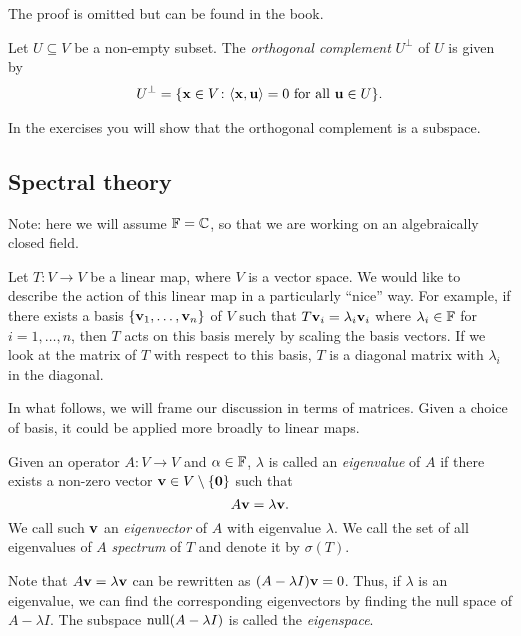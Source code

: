 \documentclass{article}
\begin{document}
The proof is omitted but can be found in the book.

\begin{definition}
Let $U\subseteq V$ be a non-empty subset. The \emph{orthogonal complement} $U^\perp$ of $U$ is given by
\begin{align*}
    U^\perp = \{ {\mathbf{x}} \in V \colon \langle {\mathbf{x}},{\mathbf{u}} \rangle = 0 \text{ for all } {\mathbf{u}} \in U\}.
\end{align*}
\end{definition}

In the exercises you will show that the orthogonal complement is a subspace. 


\subsection{Spectral theory}

Note: here we will assume ${\mathbb{F}} = {\mathbb{C}}$, so that we are working on an algebraically closed field.


Let $T \colon V \to V$ be a linear map, where $V$ is a vector space.  We would like to describe the action of this linear map in a particularly ``nice'' way. For example, if there exists a basis $\{{\mathbf{v}}_1, \ldots, {\mathbf{v}}_n\}$ of $V$ such that $T{\mathbf{v}}_i = \lambda_i {\mathbf{v}}_i$ where $\lambda_i \in {\mathbb{F}}$ for $i = 1, \ldots, n$, then $T$ acts on this basis merely by scaling the basis vectors. If we look at the matrix of $T$ with respect to this basis, $T$ is a diagonal matrix with $\lambda_i$ in the diagonal. 

In what follows, we will frame our discussion in terms of matrices. Given a choice of basis, it could be applied more broadly to linear maps.

\begin{definition}
Given an operator $A \colon V \to V$ and $\alpha \in {\mathbb{F}}$, $\lambda$ is called an \emph{eigenvalue} of $A$ if there exists a non-zero vector ${\mathbf{v}} \in V\setminus\{{\mathbf{0}}\}$ such that 
$$A {\mathbf{v}} = \lambda {\mathbf{v}}.$$
We call such ${\mathbf{v}}$ an \emph{eigenvector} of $A$ with eigenvalue $\lambda$. We call the set of all eigenvalues of $A$ \emph{spectrum} of $T$ and denote it by $\sigma(T)$.
\end{definition}

Note that $A {\mathbf{v}} = \lambda {\mathbf{v}}$ can be rewritten as $(A - \lambda I) {\mathbf{v}}= 0$. Thus, if $\lambda$ is an eigenvalue, we can find the corresponding eigenvectors by finding the null space of $A - \lambda I$. The subspace $\operatorname{null} (A - \lambda I)$ is called the \emph{eigenspace}.
\end{document}
